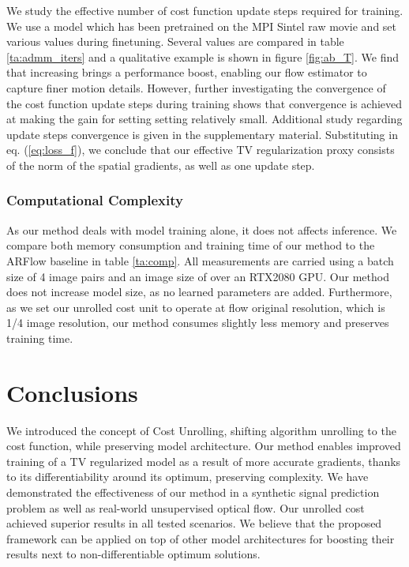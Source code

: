 \documentclass[10pt,twocolumn,letterpaper]{article}
\begin{document}
We study the effective number of cost function update steps  required for training. We use a model which has been pretrained on the MPI Sintel raw movie and set various  values during finetuning. Several  values are compared in table \ref{ta:admm_iters} and a qualitative example is shown in figure \ref{fig:ab_T}. We find  that increasing  brings a performance boost, enabling our flow estimator to capture finer motion details. 
However, further investigating the convergence of the cost function update steps during training shows that convergence is achieved at  making the gain for setting setting  relatively small. Additional study regarding update steps convergence is given in the supplementary material.
Substituting  in eq. (\ref{eq:loss_f}), we conclude that our effective TV regularization proxy consists of the  norm of the spatial gradients, as well as one update step.


\subsubsection{Computational Complexity}
As our method deals with model training alone, it does not affects inference. We compare both memory consumption and training time of our method to the ARFlow \cite{liu2020learning} baseline in table \ref{ta:comp}. All measurements are carried using a batch size of 4 image pairs and an image size of  over an RTX2080 GPU. Our method does not increase model size, as no learned parameters are added. Furthermore, as we set our unrolled cost unit to operate at flow original resolution, which is 1/4 image resolution, our method consumes slightly less memory and preserves training time. 
 \section{Conclusions}
We introduced the concept of Cost Unrolling, shifting algorithm unrolling to the cost function, while preserving model architecture. Our method enables improved training of a TV regularized model as a result of more accurate gradients, thanks to its differentiability around its optimum, preserving complexity.
We have demonstrated the effectiveness of our method in a synthetic signal prediction problem as well as real-world unsupervised optical flow. Our unrolled cost achieved superior results in all tested scenarios.
We believe that the proposed framework can be applied on top of other model architectures for boosting their results next to non-differentiable optimum solutions.

 {\small


}
\end{document}
